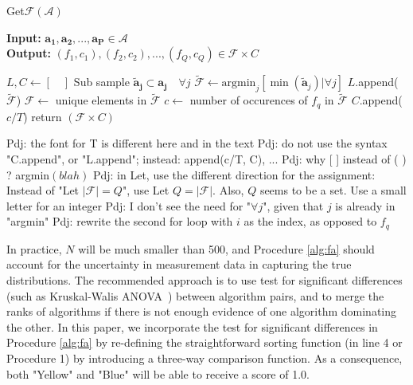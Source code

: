 \documentclass[conference]{IEEEtran}
\newcommand{\p}[1]{{\color{blue} Pdj: #1}}
\begin{document}
\begin{algorithm}
	\caption{ Get$\mathcal{F}$$(\mathcal{A})$ }
	\label{alg:fa}
	\hspace*{\algorithmicindent} \textbf{Input: } $ \mathbf{a_1},\mathbf{a_2} ,..., \mathbf{a_P}\in \mathcal{A}$ \\
	\hspace*{\algorithmicindent} \textbf{Output: } $ (f_1,c_1), (f_2, c_2), ..., (f_Q,c_Q) \in \mathcal{F} \times C  $
	\begin{algorithmic}[1] 
		\State $L, C \leftarrow [ \quad ]$ 
		\State Sub sample $\mathbf{\tilde{a}_{j}} \subset \mathbf{a_j} \quad \forall j$  
		\State $\tilde{\mathcal{F}} \leftarrow \text{argmin}_j[\min(\mathbf{\tilde{a}}_j  ) | \forall j]$ 
		\State $L$.append($\tilde{\mathcal{F}}$)
		\EndFor
		\State $\mathcal{F} \leftarrow $ unique elements in $\tilde{\mathcal{F}}$ 
		\State $c \leftarrow$ number of occurences of $f_q$ in $\tilde{\mathcal{F}}$ 
		\State $C$.append($c/T$)
		\EndFor
		\State return $(\mathcal{F} \times C)$
        \end{algorithmic}
        \p{the font for T is different here and in the text}
        \p{do not use the syntax "C.append", or "L.append"; instead: append(c/T, C), ...}
        \p{why [ ] instead of ( ) ? argmin$( blah ) $}
        \p{in Let, use the different direction for the assignment:
          Instead of "Let $|\mathcal{F}| = Q$", use Let $Q = |\mathcal{F}|$. Also, $Q$ seems to be a set. Use a small
          letter for an integer}
        \p{I don't see the need for "$\forall j$", given that $j$ is already in "argmin"}
        \p{rewrite the second for loop with $i$ as the index, as opposed to $f_q$}        
\end{algorithm}

In practice, $N$ will be much smaller than 500, and Procedure \ref{alg:fa} should account for the uncertainty in measurement data in capturing the true distributions. 
The recommended approach is to use test for significant differences (such as Kruskal-Walis
ANOVA~\cite{hoefler2015scientific}) between algorithm pairs, and to merge the ranks of algorithms if there is not enough
evidence of one algorithm dominating the other. In this paper, we incorporate the test for significant differences in
Procedure \ref{alg:fa} by re-defining the straightforward sorting function (in line 4 or Procedure 1) by introducing a
three-way comparison function. As a consequence, both "Yellow" and "Blue" will be able to receive a score of 1.0.
\end{document}
